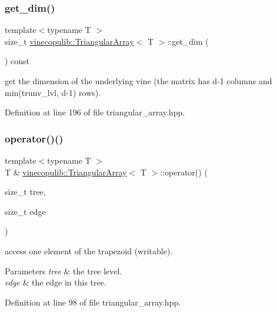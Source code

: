 \subsubsection{\texorpdfstring{get\+\_\+dim()}{get\_dim()}}
{\footnotesize\ttfamily template$<$typename T $>$ \\
size\+\_\+t \hyperlink{classvinecopulib_1_1_triangular_array}{vinecopulib\+::\+Triangular\+Array}$<$ T $>$\+::get\+\_\+dim (\begin{DoxyParamCaption}{ }\end{DoxyParamCaption}) const}

get the dimension of the underlying vine (the matrix has {\ttfamily d-\/1} columns and {\ttfamily min(trunv\+\_\+lvl, d-\/1)} rows). 

Definition at line 196 of file triangular\+\_\+array.\+hpp.

\mbox{\label{classvinecopulib_1_1_triangular_array_aeaee00fbe12f2bce4bf7f2a4479417f3}} 
\subsubsection{\texorpdfstring{operator()()}{operator()()}\hspace{0.1cm}{\footnotesize\ttfamily [1/2]}}
{\footnotesize\ttfamily template$<$typename T $>$ \\
T \& \hyperlink{classvinecopulib_1_1_triangular_array}{vinecopulib\+::\+Triangular\+Array}$<$ T $>$\+::operator() (\begin{DoxyParamCaption}\item[{size\+\_\+t}]{tree,  }\item[{size\+\_\+t}]{edge }\end{DoxyParamCaption})}



access one element of the trapezoid (writable). 


\begin{DoxyParams}{Parameters}
{\em tree} & the tree level. \\
\hline
{\em edge} & the edge in this tree. \\
\hline
\end{DoxyParams}


Definition at line 98 of file triangular\+\_\+array.\+hpp.

